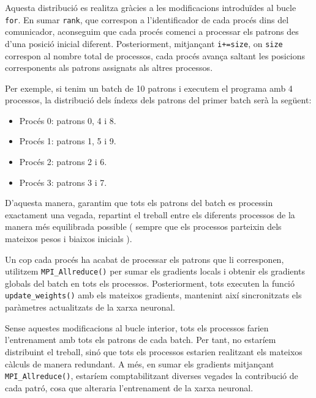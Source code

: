 \documentclass{article}
\begin{document}
Aquesta distribució es realitza gràcies a les modificacions introduïdes al bucle \texttt{for}. En sumar \texttt{rank}, que correspon a l'identificador de cada procés dins del comunicador, aconseguim que cada procés comenci a processar els patrons des d'una posició inicial diferent. Posteriorment, mitjançant \texttt{i+=size}, on \texttt{size} correspon al nombre total de processos, cada procés avança saltant les posicions corresponents als patrons assignats als altres processos.

Per exemple, si tenim un batch de 10 patrons i executem el programa amb 4 processos, la distribució dels índexs dels patrons del primer batch serà la següent:

\begin{itemize}
    \item Procés 0: patrons 0, 4 i 8.
    \item Procés 1: patrons 1, 5 i 9.
    \item Procés 2: patrons 2 i 6.
    \item Procés 3: patrons 3 i 7.
\end{itemize}

D'aquesta manera, garantim que tots els patrons del batch es processin exactament una vegada, repartint el treball entre els diferents processos de la manera més equilibrada possible ( sempre que els processos parteixin dels mateixos pesos i biaixos inicials ).

Un cop cada procés ha acabat de processar els patrons que li corresponen, utilitzem \texttt{MPI\_Allreduce()} per sumar els gradients locals i obtenir els gradients globals del batch en tots els processos. Posteriorment, tots executen la funció \texttt{update\_weights()} amb els mateixos gradients, mantenint així sincronitzats els paràmetres actualitzats de la xarxa neuronal.

Sense aquestes modificacions al bucle interior, tots els processos farien l'entrenament amb tots els patrons de cada batch. Per tant, no estaríem distribuint el treball, sinó que tots els processos estarien realitzant els mateixos càlculs de manera redundant. A més, en sumar els gradients mitjançant \texttt{MPI\_Allreduce()}, estaríem comptabilitzant diverses vegades la contribució de cada patró, cosa que alteraria l'entrenament de la xarxa neuronal.
\end{document}
